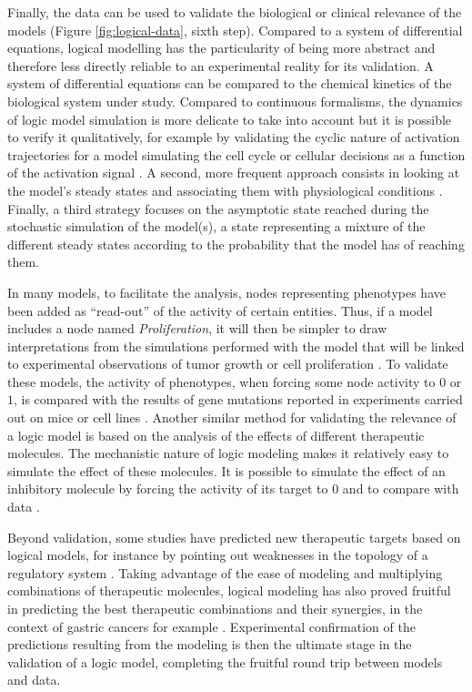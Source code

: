 \documentclass[a4paper,12pt,twoside,onecolumn,openright,final,oldfontcommands]{memoir}
\begin{document}
Finally, the data can be used to validate the biological or clinical
relevance of the models (Figure \ref{fig:logical-data}, sixth step).
Compared to a system of differential equations, logical modelling has
the particularity of being more abstract and therefore less directly
reliable to an experimental reality for its validation. A system of
differential equations can be compared to the chemical kinetics of the
biological system under study. Compared to continuous formalisms, the
dynamics of logic model simulation is more delicate to take into account
but it is possible to verify it qualitatively, for example by validating
the cyclic nature of activation trajectories for a model simulating the
cell cycle \citep{faure2006dynamical} or cellular decisions as a
function of the activation signal \citep{calzone2010mathematical}. A
second, more frequent approach consists in looking at the model's steady
states and associating them with physiological conditions
\citep[\citet{cohen2015mathematical}]{weinstein2017network}. Finally, a
third strategy focuses on the asymptotic state reached during the
stochastic simulation of the model(s), a state representing a mixture of
the different steady states according to the probability that the model
has of reaching them.

In many models, to facilitate the analysis, nodes representing
phenotypes have been added as ``read-out'' of the activity of certain
entities. Thus, if a model includes a node named \emph{Proliferation},
it will then be simpler to draw interpretations from the simulations
performed with the model that will be linked to experimental
observations of tumor growth or cell proliferation
\citep{grieco2013integrative, steinway2015combinatorial}. To validate
these models, the activity of phenotypes, when forcing some node
activity to \(0\) or \(1\), is compared with the results of gene
mutations reported in experiments carried out on mice or cell lines
\citep{faure2006dynamical, cohen2015mathematical}. Another similar
method for validating the relevance of a logic model is based on the
analysis of the effects of different therapeutic molecules. The
mechanistic nature of logic modeling makes it relatively easy to
simulate the effect of these molecules. It is possible to simulate the
effect of an inhibitory molecule by forcing the activity of its target
to 0 and to compare with data
\citep{zanudo2017network, iorio2016landscape, knijnenburg2016logic}.

Beyond validation, some studies have predicted new therapeutic targets
based on logical models, for instance by pointing out weaknesses in the
topology of a regulatory system \citep{sahin2009modeling}. Taking
advantage of the ease of modeling and multiplying combinations of
therapeutic molecules, logical modeling has also proved fruitful in
predicting the best therapeutic combinations and their synergies, in the
context of gastric cancers for example \citep{flobak2015discovery}.
Experimental confirmation of the predictions resulting from the modeling
is then the ultimate stage in the validation of a logic model,
completing the fruitful round trip between models and data.
\end{document}
